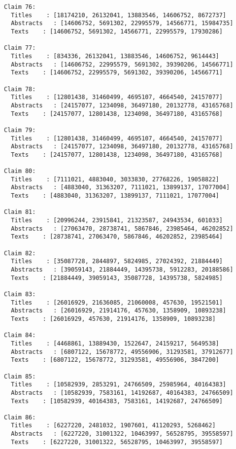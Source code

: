 \documentclass[11pt]{article}
\begin{document}
\begin{Verbatim}[commandchars=\\\{\}]
Claim 76:
  Titles    : [18174210, 26132041, 13883546, 14606752, 8672737]
  Abstracts   : [14606752, 5691302, 22995579, 14566771, 15984735]
  Texts    : [14606752, 5691302, 14566771, 22995579, 17930286]

Claim 77:
  Titles    : [834336, 26132041, 13883546, 14606752, 9614443]
  Abstracts   : [14606752, 22995579, 5691302, 39390206, 14566771]
  Texts    : [14606752, 22995579, 5691302, 39390206, 14566771]

Claim 78:
  Titles    : [12801438, 31460499, 4695107, 4664540, 24157077]
  Abstracts   : [24157077, 1234098, 36497180, 20132778, 43165768]
  Texts    : [24157077, 12801438, 1234098, 36497180, 43165768]

Claim 79:
  Titles    : [12801438, 31460499, 4695107, 4664540, 24157077]
  Abstracts   : [24157077, 1234098, 36497180, 20132778, 43165768]
  Texts    : [24157077, 12801438, 1234098, 36497180, 43165768]

Claim 80:
  Titles    : [7111021, 4883040, 3033830, 27768226, 19058822]
  Abstracts   : [4883040, 31363207, 7111021, 13899137, 17077004]
  Texts    : [4883040, 31363207, 13899137, 7111021, 17077004]

Claim 81:
  Titles    : [20996244, 23915841, 21323587, 24943534, 601033]
  Abstracts   : [27063470, 28738741, 5867846, 23985464, 46202852]
  Texts    : [28738741, 27063470, 5867846, 46202852, 23985464]

Claim 82:
  Titles    : [35087728, 2844897, 5824985, 27024392, 21884449]
  Abstracts   : [39059143, 21884449, 14395738, 5912283, 20188586]
  Texts    : [21884449, 39059143, 35087728, 14395738, 5824985]

Claim 83:
  Titles    : [26016929, 21636085, 21060008, 457630, 19521501]
  Abstracts   : [26016929, 21914176, 457630, 1358909, 10893238]
  Texts    : [26016929, 457630, 21914176, 1358909, 10893238]

Claim 84:
  Titles    : [4468861, 13889430, 1522647, 24159217, 5649538]
  Abstracts   : [6807122, 15678772, 49556906, 31293581, 37912677]
  Texts    : [6807122, 15678772, 31293581, 49556906, 3847200]

Claim 85:
  Titles    : [10582939, 2853291, 24766509, 25985964, 40164383]
  Abstracts   : [10582939, 7583161, 14192687, 40164383, 24766509]
  Texts    : [10582939, 40164383, 7583161, 14192687, 24766509]

Claim 86:
  Titles    : [6227220, 2481032, 1907601, 41120293, 5268462]
  Abstracts   : [6227220, 31001322, 10463997, 56528795, 39558597]
  Texts    : [6227220, 31001322, 56528795, 10463997, 39558597]


\end{Verbatim}
\end{document}
